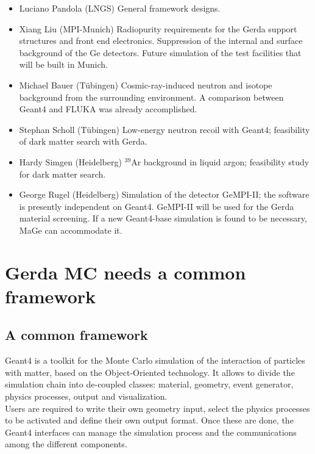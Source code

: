 \documentclass[a4paper,12pt,twoside]{article}
\begin{document}
\begin{itemize}

\item Luciano Pandola (LNGS)
General framework designs.

\item Xiang Liu (MPI-Munich)
Radiopurity requirements for the Gerda
support structures and front end electronics.
Suppression of the internal
and surface background of the Ge detectors.
Future simulation of the test facilities that will be built 
in Munich.

\item Michael Bauer (T\"{u}bingen)
Cosmic-ray-induced neutron and isotope background from the surrounding
environment. A comparison
between Geant4 and FLUKA was already accomplished.

\item Stephan Scholl (T\"{u}bingen)
Low-energy neutron recoil with Geant4; feasibility of dark matter 
search with Gerda.

\item Hardy Simgen (Heidelberg)
$^{39}$Ar background in liquid argon; feasibility study
for dark matter search.


\item George Rugel (Heidelberg)
Simulation of the detector GeMPI-II; the software is presently independent 
on Geant4. GeMPI-II will be used for the Gerda material screening. 
If a new Geant4-base simulation is found to be necessary, 
MaGe can accommodate it.


\end{itemize}

\section{Gerda MC needs a common framework }
\label{sec:gerda-mc-needs-a-common-framework}

\subsection{A common framework}

Geant4\cite{G4ref} is a toolkit for the Monte Carlo simulation of the interaction 
of particles with matter, based on the Object-Oriented technology. 
It allows to divide 
the simulation chain into de-coupled classes: material, 
geometry, event generator, physics processes, output and 
visualization.\\
Users are required to write their own geometry input,
select the physics processes to be activated and define 
their own output format.
Once these are done, the Geant4 interfaces can manage the 
simulation process and the communications among the different 
components. \\
\end{document}
